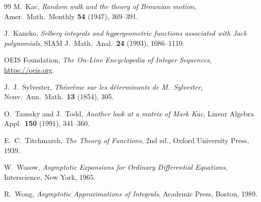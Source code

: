\documentclass[11pt,a4paper]{article}
\theoremstyle{definition}
\theoremstyle{remark}
\numberwithin{equation}{section}
\begin{document}
\begin{thebibliography}{99}
M.~Kac, \emph{Random walk and the theory of Brownian motion}, Amer.\ Math.\ Monthly \textbf{54} (1947), 369--391.

J.~Kaneko, \emph{Selberg integrals and hypergeometric functions associated with Jack polynomials}, SIAM J.\ Math.\ Anal.\ \textbf{24} (1993), 1086--1110.

OEIS Foundation, \emph{The On-Line Encyclopedia of Integer Sequences}, \url{https://oeis.org}.

J.~J.~Sylvester, \emph{Th\'eor\`eme sur les d\'eterminants de M.~Sylvester}, Nouv.\ Ann.\ Math.\ \textbf{13} (1854), 305.

O.~Taussky and J.~Todd, \emph{Another look at a matrix of Mark Kac}, Linear Algebra Appl.\ \textbf{150} (1991), 341--360.

E.~C.~Titchmarsh, \emph{The Theory of Functions}, 2nd ed., Oxford University Press, 1939.

W.~Wasow, \emph{Asymptotic Expansions for Ordinary Differential Equations}, Interscience, New York, 1965.

R.~Wong, \emph{Asymptotic Approximations of Integrals}, Academic Press, Boston, 1989.

\end{thebibliography}
\end{document}
